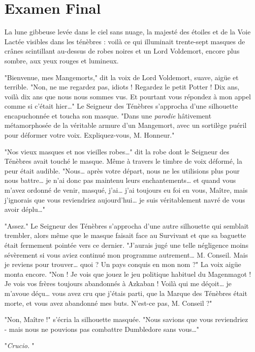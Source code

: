 
\chapter{Examen Final}

La lune gibbeuse levée dans le ciel sans nuage, la majesté des étoiles et de la Voie Lactée visibles dans les ténèbres : voilà ce qui illuminait trente-sept masques de crânes scintillant au-dessus de robes noires et un Lord Voldemort, encore plus sombre, aux yeux rouges et lumineux.

"Bienvenue, mes Mangemorts," dit la voix de Lord Voldemort, suave, aigüe et terrible. "Non, ne me regardez pas, idiots ! Regardez le petit Potter ! Dix ans, voilà dix ans que nous nous sommes vus. Et pourtant vous répondez à mon appel comme si c'était hier…" Le Seigneur des Ténèbres s'approcha d'une silhouette encapuchonnée et toucha son masque. "Dans une \emph{parodie}  hâtivement métamorphosée de la véritable armure d'un Mangemort, avec un sortilège puéril pour déformer votre voix. Expliquez-vous, M. Honneur."

"Nos vieux masques et nos vieilles robes…" dit la robe dont le Seigneur des Ténèbres avait touché le masque. Même à travers le timbre de voix déformé, la peur était audible. "Nous… après votre départ, nous ne les utilisions plus pour nous battre… je n'ai donc pas maintenu leurs enchantements… et quand vous m'avez ordonné de venir, masqué, j'ai… j'ai toujours eu foi en vous, Maître, mais j'ignorais que vous reviendriez aujourd'hui… je suis véritablement navré de vous avoir déplu…"

"Assez." Le Seigneur des Ténèbres s'approcha d'une autre silhouette qui semblait trembler, alors même que le masque faisait face au Survivant et que sa baguette était fermement pointée vers ce dernier. "J'aurais jugé une telle négligence moins sévèrement si vous aviez continué mon programme autrement… M. Conseil. Mais je reviens pour trouver… quoi ? Un pays conquis en mon nom ?" La voix aigüe monta encore. "Non ! Je vois que jouez le jeu politique habituel du Magenmagot ! Je vois vos frères toujours abandonnés à Azkaban ! Voilà qui me déçoit… je m'avoue déçu… vous avez cru que j'étais parti, que la Marque des Ténèbres était morte, et vous avez abandonné mes buts. N'est-ce pas, M. Conseil ?"

"Non, Maître !" s'écria la silhouette masquée. "Nous savions que vous reviendriez - mais nous ne pouvions pas combattre Dumbledore sans vous…"

"\emph{Crucio.} "

